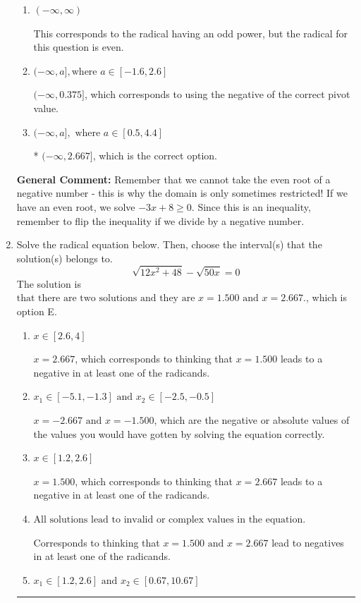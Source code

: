 \documentclass{extbook}[14pt]
\newcommand{\litem}[1]{\item #1

\rule{\textwidth}{0.4pt}}
\begin{document}
\begin{enumerate}
{\begin{enumerate}[label=\Alph*.]
$[0.375, \infty)$, which corresponds to reversing the direction of the domain AND using the negative of the correct pivot value.
\item \( (-\infty, \infty) \)

This corresponds to the radical having an odd power, but the radical for this question is even.
\item \( (-\infty, a], \text{where } a \in [-1.6, 2.6] \)

$(-\infty, 0.375]$, which corresponds to using the negative of the correct pivot value.
\item \( (-\infty, a], \text{ where } a \in [0.5, 4.4] \)

* $(-\infty, 2.667]$, which is the correct option.
\end{enumerate}

\textbf{General Comment:} Remember that we cannot take the even root of a negative number - this is why the domain is only sometimes restricted! If we have an even root, we solve $-3 x + 8 \geq 0$. Since this is an inequality, remember to flip the inequality if we divide by a negative number.
}
\litem{
Solve the radical equation below. Then, choose the interval(s) that the solution(s) belongs to.
\[ \sqrt{12 x^2 + 48} - \sqrt{50 x} = 0 \]The solution is \( \text{that there are two solutions and they are } x = 1.500 \text{ and } x = 2.667. \), which is option E.\begin{enumerate}[label=\Alph*.]
\item \( x \in [2.6,4] \)

$x = 2.667$, which corresponds to thinking that $x = 1.500$ leads to a negative in at least one of the radicands.
\item \( x_1 \in [-5.1, -1.3] \text{ and } x_2 \in [-2.5,-0.5] \)

$x = -2.667 \text{ and } x = -1.500$, which are the negative or absolute values of the values you would have gotten by solving the equation correctly.
\item \( x \in [1.2,2.6] \)

$x = 1.500$, which corresponds to thinking that $x = 2.667$ leads to a negative in at least one of the radicands.
\item \( \text{All solutions lead to invalid or complex values in the equation.} \)

Corresponds to thinking that $x = 1.500 \text{ and } x = 2.667$ lead to negatives in at least one of the radicands.
\item \( x_1 \in [1.2, 2.6] \text{ and } x_2 \in [0.67,10.67] \)


\end{enumerate}}
\end{enumerate}
\end{document}
